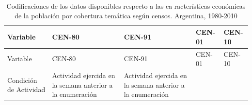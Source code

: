 \documentclass[
]{book}
\begin{document}
\begin{longtable}[]{@{}lllll@{}}
\caption{Codificaciones de los datos disponibles respecto a las ca-racterísticas económicas de la población por cobertura temática según censos. Argentina, 1980-2010}\tabularnewline
\toprule
\begin{minipage}[b]{0.06\columnwidth}\raggedright
Variable\strut
\end{minipage} & \begin{minipage}[b]{0.24\columnwidth}\raggedright
CEN-80\strut
\end{minipage} & \begin{minipage}[b]{0.24\columnwidth}\raggedright
CEN-91\strut
\end{minipage} & \begin{minipage}[b]{0.15\columnwidth}\raggedright
CEN-01\strut
\end{minipage} & \begin{minipage}[b]{0.17\columnwidth}\raggedright
CEN-10\strut
\end{minipage}\tabularnewline
\midrule
\endfirsthead
\toprule
\begin{minipage}[b]{0.06\columnwidth}\raggedright
Variable\strut
\end{minipage} & \begin{minipage}[b]{0.24\columnwidth}\raggedright
CEN-80\strut
\end{minipage} & \begin{minipage}[b]{0.24\columnwidth}\raggedright
CEN-91\strut
\end{minipage} & \begin{minipage}[b]{0.15\columnwidth}\raggedright
CEN-01\strut
\end{minipage} & \begin{minipage}[b]{0.17\columnwidth}\raggedright
CEN-10\strut
\end{minipage}\tabularnewline
\midrule
\endhead
\begin{minipage}[t]{0.06\columnwidth}\raggedright
Condición de Actividad\strut
\end{minipage} & \begin{minipage}[t]{0.24\columnwidth}\raggedright
Actividad ejercida en la semana anterior a la enumeración\strut
\end{minipage} & \begin{minipage}[t]{0.24\columnwidth}\raggedright
Actividad ejercida en la semana anterior a la enumeración\strut
\end{minipage} & \begin{minipage}[t]{0.15\columnwidth}\raggedright

\end{minipage}
\end{longtable}
\end{document}

